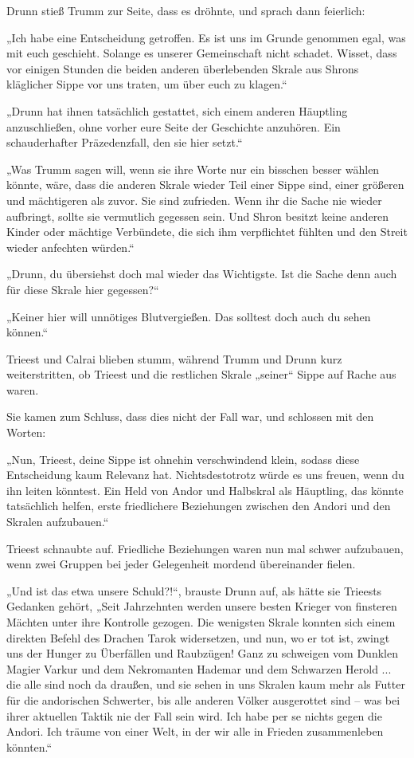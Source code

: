 Drunn stieß Trumm zur Seite, dass es dröhnte, und sprach dann feierlich:

„Ich habe eine Entscheidung getroffen. Es ist uns im Grunde genommen egal, was mit euch geschieht. Solange es unserer Gemeinschaft nicht schadet. Wisset, dass vor einigen Stunden die beiden anderen überlebenden Skrale aus Shrons kläglicher Sippe vor uns traten, um über euch zu klagen.“

„Drunn hat ihnen tatsächlich gestattet, sich einem anderen Häuptling anzuschließen, ohne vorher eure Seite der Geschichte anzuhören. Ein schauderhafter Präzedenzfall, den sie hier setzt.“

„Was Trumm sagen will, wenn sie ihre Worte nur ein bisschen besser wählen könnte, wäre, dass die anderen Skrale wieder Teil einer Sippe sind, einer größeren und mächtigeren als zuvor. Sie sind zufrieden. Wenn ihr die Sache nie wieder aufbringt, sollte sie vermutlich gegessen sein. Und Shron besitzt keine anderen Kinder oder mächtige Verbündete, die sich ihm verpflichtet fühlten und den Streit wieder anfechten würden.“

„Drunn, du übersiehst doch mal wieder das Wichtigste. Ist die Sache denn auch für diese Skrale hier gegessen?“

„Keiner hier will unnötiges Blutvergießen. Das solltest doch auch du sehen können.“

Trieest und Calrai blieben stumm, während Trumm und Drunn kurz weiterstritten, ob Trieest und die restlichen Skrale „seiner“ Sippe auf Rache aus waren.

Sie kamen zum Schluss, dass dies nicht der Fall war, und schlossen mit den Worten:

„Nun, Trieest, deine Sippe ist ohnehin verschwindend klein, sodass diese Entscheidung kaum Relevanz hat. Nichtsdestotrotz würde es uns freuen, wenn du ihn leiten könntest. Ein Held von Andor und Halbskral als Häuptling, das könnte tatsächlich helfen, erste friedlichere Beziehungen zwischen den Andori und den Skralen aufzubauen.“

Trieest schnaubte auf. Friedliche Beziehungen waren nun mal schwer aufzubauen, wenn zwei Gruppen bei jeder Gelegenheit mordend übereinander fielen.

„Und ist das etwa unsere Schuld?!“, brauste Drunn auf, als hätte sie Trieests Gedanken gehört, „Seit Jahrzehnten werden unsere besten Krieger von finsteren Mächten unter ihre Kontrolle gezogen. Die wenigsten Skrale konnten sich einem direkten Befehl des Drachen Tarok widersetzen, und nun, wo er tot ist, zwingt uns der Hunger zu Überfällen und Raubzügen! Ganz zu schweigen vom Dunklen Magier Varkur und dem Nekromanten Hademar und dem Schwarzen Herold ... die alle sind noch da draußen, und sie sehen in uns Skralen kaum mehr als Futter für die andorischen Schwerter, bis alle anderen Völker ausgerottet sind – was bei ihrer aktuellen Taktik nie der Fall sein wird. Ich habe per se nichts gegen die Andori. Ich träume von einer Welt, in der wir alle in Frieden zusammenleben könnten.“

